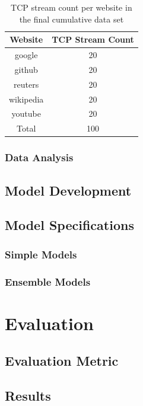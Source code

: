 \documentclass[10pt,sigconf,letterpaper,nonacm]{acmart}
\begin{document}
\begin{table}
  \caption{TCP stream count per website in the final cumulative data set}
  \label{tab:dataSize}
  \begin{tabular}{cc}
    \toprule
    Website & TCP Stream Count \\
    \midrule
    google & 20 \\
    github & 20 \\
    reuters & 20 \\
    wikipedia & 20 \\
    youtube & 20 \\
    \midrule
    Total & 100 \\
    \bottomrule
  \end{tabular}
\end{table}

\subsubsection{Data Analysis}

\subsection{Model Development}

\subsection{Model Specifications}

\subsubsection{Simple Models}

\subsubsection{Ensemble Models}


\section{Evaluation}

\subsection{Evaluation Metric}

\subsection{Results}
\end{document}

